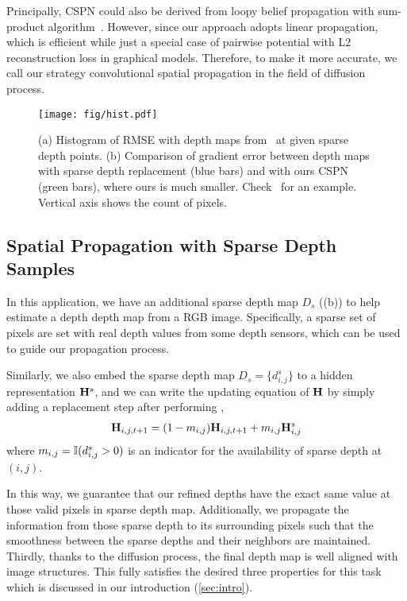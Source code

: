 Principally, CSPN could also be derived from loopy belief propagation with sum-product algorithm~\cite{kschischang2001factor}. However, since our approach adopts linear propagation, which is efficient while just a special case of pairwise potential with L2 reconstruction loss in graphical models. Therefore, to make it more accurate, we call our strategy convolutional spatial propagation in the field of diffusion process.

\begin{figure}[t]
\centering
\texttt{[image: fig/hist.pdf]}
\caption {(a) Histogram of RMSE with depth maps from~\cite{Ma2017SparseToDense} at given sparse depth points.  (b) Comparison of gradient error between depth maps with sparse depth replacement (blue bars) and with ours CSPN (green bars), where ours is much smaller. Check~ for an example. Vertical axis shows the count of pixels.}
\label{fig:hist}
\end{figure}

\subsection{Spatial Propagation with Sparse Depth Samples}
In this application, we have an additional sparse depth map $D_s$ ((b)) to help estimate a depth depth map from a RGB image. Specifically, a sparse set of pixels are set with real depth values from some depth sensors, which can be used to guide our propagation process. 

Similarly, we also embed the sparse depth map $D_s = \{d_{i,j}^s\}$ to a hidden representation ${\mathbf H}^s$,  and we can write the updating equation of ${\mathbf H}$ by simply adding a replacement step after performing , 
\begin{align}
    {\mathbf H}_{i, j, t+1} = (1 - m_{i, j}) {\mathbf H}_{i, j, t+1}  +  m_{i, j} {\mathbf H}_{i, j}^s 
\label{eqn:cspn_sp}
\end{align}
where $m_{i, j} = {\mathbb I}(d_{i, j}^s > 0)$ is an indicator for the availability of sparse depth at $(i, j)$. 

In this way, we guarantee that our refined depths have the exact same value at those valid pixels in sparse depth map. Additionally, we propagate the information from those sparse depth to its surrounding pixels such that the smoothness between the sparse depths and their neighbors are maintained. 
Thirdly, thanks to the diffusion process, the final depth map is well aligned with image structures. 
This fully satisfies the desired three properties for this task which is discussed in our introduction (\ref{sec:intro}). 

